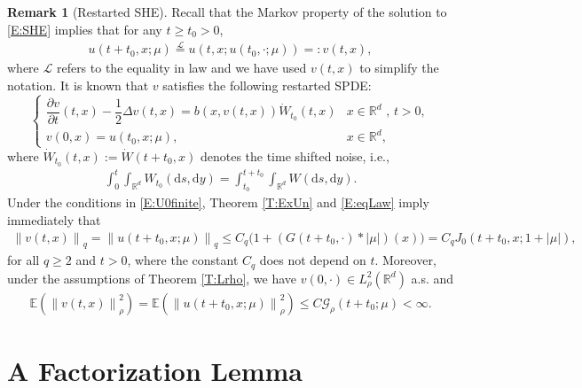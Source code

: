 \documentclass[12pt]{report}
\theoremstyle{plain}
\theoremstyle{definition}
\newtheorem{remark}[theorem]{Remark}
\numberwithin{equation}{section}
\newcommand{\R}{\mathbb{R}}
\newcommand{\E}{\mathbb{E}}
\newcommand{\Norm}[1]{\left\|  #1   \right\|}
\newcommand{\ud}{\ensuremath{ \mathrm{d} }}
\begin{document}
\begin{remark}[Restarted SHE] \label{R:Restat}
	Recall that the Markov property of the solution to \eqref{E:SHE} implies that for any $t\ge
	t_0>0$,
	\begin{align} \label{E:eqLaw}
	u(t + t_0,x;\mu) \stackrel{\mathcal{L}}{=}
	u\left(t,x;u\left(t_0,\cdot;\mu\right)\right) =: v(t,x),
	\end{align}
	where $\mathcal{L}$ refers to the equality in law and we have used $v(t,x)$ to simplify the
	notation. It is known that $v$ satisfies the following restarted SPDE:
	\begin{equation} \label{E:restart}
	\begin{cases}
	\dfrac{\partial v}{\partial t}(t,x)-\dfrac{1}{2}\Delta v(t,x) = b(x,v(t,x))\dot W_{t_0}(t,x) & \text{$x\in \R^d$ , $t>0$}, \\
	v(0,x) = u(t_0,x;\mu),                                                                       & x\in\R^d,
	\end{cases}
	\end{equation}
	where $\dot{W}_{t_0}(t,x) := \dot{W}(t + t_0,x)$ denotes the time shifted noise, i.e.,
	\begin{align} \label{E:ShiftW}
	\int_0^t \int_{\R^d} W_{t_0}(\ud s, \ud y) = \int_{t_0}^{t+t_0} \int_{\R^d} W(\ud s, \ud y).
	\end{align}
	Under the conditions in \eqref{E:U0finite}, Theorem \ref{T:ExUn} and \eqref{E:eqLaw} imply immediately
	that
	\begin{align}\label{E:MomBddRst}
	\Norm{v(t,x)}_q =   \Norm{u(t+t_0,x;\mu)}_q
	\le C_q\bigg(1 + (G(t+t_0, \cdot)* |\mu|)(x) \bigg)
	=   C_q J_0(t+t_0,x; 1+|\mu|),
	\end{align}
	for all $q\ge 2$ and $t>0$, where the constant $C_q$ does not depend on $t$. Moreover, under the
	assumptions of Theorem \ref{T:Lrho}, we have $v(0,\cdot)\in L_\rho^2(\R^d)$ a.s. and
	\begin{align} \label{E:MomRhoBddRst}
	\E\left(\Norm{v(t,x)}_\rho^2\right)
	=   \E\left(\Norm{u(t+t_0,x;\mu)}_\rho^2\right)
	\le C \mathcal{G}_\rho(t+t_0;\mu)
	<   \infty.
	\end{align}
\end{remark}

\section{A Factorization Lemma} \label{S:Factor}
\end{document}
